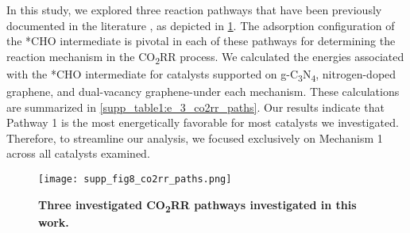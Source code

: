 In this study, we explored three reaction pathways that have been previously documented in the literature \cite{durand2011structure, nie2014reaction, peterson2010copper}, as depicted in \cref{supp_fig8:co2rr_paths}.
The adsorption configuration of the *CHO intermediate is pivotal in each of these pathways for determining the reaction mechanism in the CO\textsubscript{2}RR process.
We calculated the energies associated with the *CHO intermediate for catalysts
supported on g-C\textsubscript{3}N\textsubscript{4}, nitrogen-doped graphene, and dual-vacancy graphene-under each mechanism.
These calculations are summarized in \cref{supp_table1:e_3_co2rr_paths}.
Our results indicate that Pathway 1 is the most energetically favorable for most catalysts we investigated.
Therefore, to streamline our analysis, we focused exclusively on Mechanism 1 across all catalysts examined.

\begin{figure}[htbp]
  \centering
  \texttt{[image: supp\_fig8\_co2rr\_paths.png]}
  \caption{\textbf{Three investigated CO\textsubscript{2}RR pathways \cite{durand2011structure, nie2014reaction, peterson2010copper} investigated in this work.}}
  \label{supp_fig8:co2rr_paths}
\end{figure}

